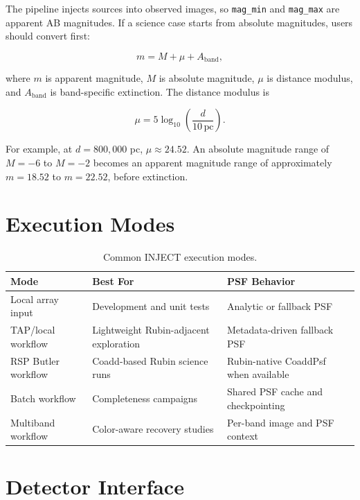 \documentclass[11pt]{article}
\begin{document}
The pipeline injects sources into observed images, so \texttt{mag\_min} and \texttt{mag\_max} are apparent AB magnitudes. If a science case starts from absolute magnitudes, users should convert first:

\begin{equation}
    m = M + \mu + A_{\mathrm{band}},
\end{equation}

where $m$ is apparent magnitude, $M$ is absolute magnitude, $\mu$ is distance modulus, and $A_{\mathrm{band}}$ is band-specific extinction. The distance modulus is

\begin{equation}
    \mu = 5 \log_{10}\left(\frac{d}{10\,\mathrm{pc}}\right).
\end{equation}

For example, at $d=800{,}000$ pc, $\mu \approx 24.52$. An absolute magnitude range of $M=-6$ to $M=-2$ becomes an apparent magnitude range of approximately $m=18.52$ to $m=22.52$, before extinction.

\section{Execution Modes}

\begin{table}[h]
\centering
\begin{tabular}{lll}
\toprule
Mode & Best For & PSF Behavior \\
\midrule
Local array input & Development and unit tests & Analytic or fallback PSF \\
TAP/local workflow & Lightweight Rubin-adjacent exploration & Metadata-driven fallback PSF \\
RSP Butler workflow & Coadd-based Rubin science runs & Rubin-native CoaddPsf when available \\
Batch workflow & Completeness campaigns & Shared PSF cache and checkpointing \\
Multiband workflow & Color-aware recovery studies & Per-band image and PSF context \\
\bottomrule
\end{tabular}
\caption{Common INJECT execution modes.}
\end{table}

\section{Detector Interface}
\end{document}
